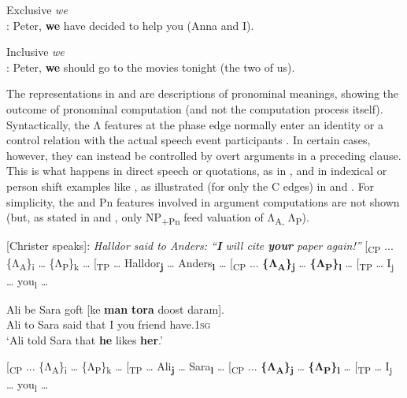 \documentclass[output=paper]{LSP/langsci}
\begin{document}
\ea%
    \label{ex:Sigurdsson:32}
    \upshape Exclusive \textit{we}\\\relax
	  [X speaks]:  Peter, \textbf{we} have decided to help you (Anna and I).
\z

\ea%
    \label{ex:Sigurdsson:33}
    \upshape Inclusive \textit{we}\\\relax
	  [X speaks]:  Peter, \textbf{we} should go to the movies tonight (the two of us).
\z


The representations in  and  are descriptions of pronominal meanings, showing the outcome of pronominal computation (and not the computation process itself). Syntactically, the Λ features at the phase edge normally enter an identity or a control relation with the actual speech event participants \citep{Sigurðsson2004,Sigurðsson2011}. In certain cases, however, they can instead be controlled by overt arguments in a preceding clause. This is what happens in direct speech or quotations, as in , and in indexical or person shift examples like , as illustrated (for only the C edges) in  and . For simplicity, the  and Pn features involved in argument computations are not shown (but, as stated in  and , only NP\textsubscript{+Pn} feed valuation of Λ\textsubscript{A,} Λ\textsubscript{P}).

\ea%
    \label{ex:Sigurdsson:34}
	  [Christer speaks]: \textit{Halldor said to Anders: “\textbf{I} will cite \textbf{your} paper again!”}
[\textsubscript{CP} ... \{Λ\textsubscript{A}\}\textsubscript{i} … \{Λ\textsubscript{P}\}\textsubscript{k} … [\textsubscript{TP}  … Halldor\textbf{\textsubscript{j} }… Anders\textbf{\textsubscript{l}} … [\textsubscript{CP} ... \textbf{\{Λ\textsubscript{A}\}\textsubscript{j}} … \textbf{\{Λ\textsubscript{P}\}\textsubscript{l}} … [\textsubscript{TP} … I\textsubscript{j} … you\textsubscript{l} …
\z

\ea%
    \label{ex:Sigurdsson:35}
  Ali  be  Sara  goft  [ke  \textbf{man}  \textbf{tora}  doost  daram].\\
    {} Ali  to  Sara  said  that  I  you  friend  have.1\textsc{sg}\\
\glt  ‘Ali told Sara that \textbf{he} likes \textbf{her}.’

[\textsubscript{CP} ... \{Λ\textsubscript{A}\}\textsubscript{i} … \{Λ\textsubscript{P}\}\textsubscript{k} … [\textsubscript{TP}  … Ali\textbf{\textsubscript{j}} … Sara\textbf{\textsubscript{l}} … [\textsubscript{CP} ... \textbf{\{Λ\textsubscript{A}\}\textsubscript{j}} … \textbf{\{Λ\textsubscript{P}\}\textsubscript{l}} … [\textsubscript{TP} … I\textsubscript{j} … you\textsubscript{l} …
\z
\end{document}

